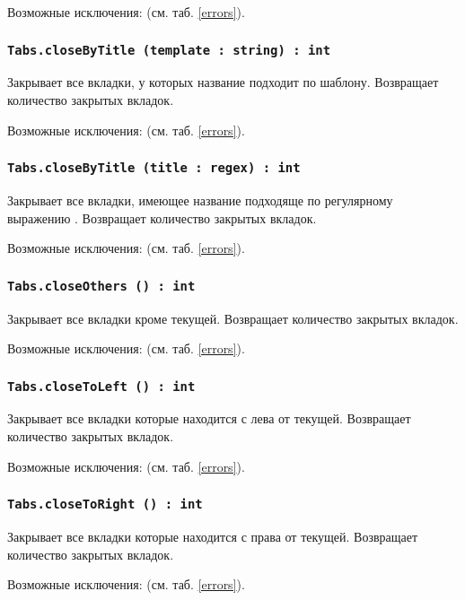 Возможные исключения:  (см. таб. \ref{errors}).

\subsubsection{\lstinline|Tabs.closeByTitle (template : string) : int|}

Закрывает все вкладки, у которых название подходит по шаблону. Возвращает количество закрытых вкладок.

Возможные исключения:  (см. таб. \ref{errors}).

\subsubsection{\lstinline|Tabs.closeByTitle (title : regex) : int|}

Закрывает все вкладки, имеющее название подходяще по регулярному выражению . Возвращает количество закрытых вкладок.

Возможные исключения:  (см. таб. \ref{errors}).

\subsubsection{\lstinline|Tabs.closeOthers () : int|}

Закрывает все вкладки кроме текущей. Возвращает количество закрытых вкладок.

Возможные исключения:  (см. таб. \ref{errors}).

\subsubsection{\lstinline|Tabs.closeToLeft () : int|}

Закрывает все вкладки которые находится с лева от текущей. Возвращает количество закрытых вкладок.

Возможные исключения:  (см. таб. \ref{errors}).

\subsubsection{\lstinline|Tabs.closeToRight () : int|}

Закрывает все вкладки которые находится с права от текущей. Возвращает количество закрытых вкладок.

Возможные исключения:  (см. таб. \ref{errors}).

